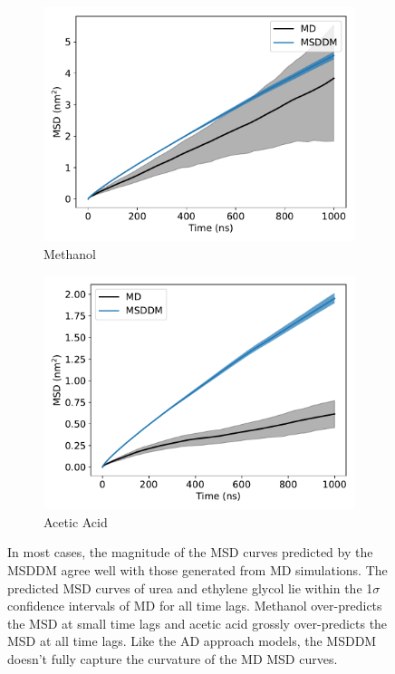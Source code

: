 \documentclass[journal=jctcce,manuscript=article]{achemso}
\begin{document}
\begin{figure}
\begin{subfigure}{0.45\textwidth}
  \includegraphics[width=\textwidth]{MET_msddm.pdf}
  \caption{Methanol}\label{fig:MET_msddm}
  \end{subfigure}
  \begin{subfigure}{0.45\textwidth}
  \includegraphics[width=\textwidth]{ACH_msddm.pdf}
  \caption{Acetic Acid}\label{fig:ACH_msddm}
  \end{subfigure}
  \caption{In most cases, the magnitude of the MSD curves predicted by the
	  MSDDM agree well with those generated from MD simulations. The
	  predicted MSD curves of urea and ethylene glycol lie within the
	  1$\sigma$ confidence intervals of MD for all time lags. Methanol
	  over-predicts the MSD at small time lags and acetic acid grossly
	  over-predicts the MSD at all time lags.  Like the AD approach models,
	  the MSDDM doesn't fully capture the curvature of the MD MSD curves.
	  }\label{fig:msddm_performance}
  \end{figure}
  
\end{document}
